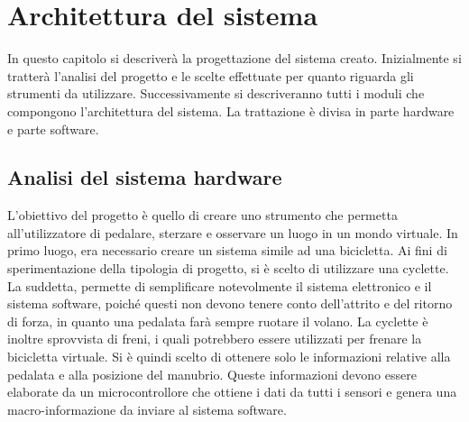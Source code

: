\chapter{Architettura del sistema}
\label{capitolo3}
\thispagestyle{empty}

\noindent In questo capitolo si descriverà la progettazione del sistema creato. Inizialmente si tratterà l'analisi del progetto e le scelte effettuate per quanto riguarda gli strumenti da utilizzare. Successivamente si descriveranno tutti i moduli che compongono l'architettura del sistema. La trattazione è divisa in parte hardware e parte software.
\section{Analisi del sistema hardware}
L'obiettivo del progetto è quello di creare uno strumento che permetta all'utilizzatore di pedalare, sterzare e osservare un luogo in un mondo virtuale. In primo luogo, era necessario creare un sistema simile ad una bicicletta. Ai fini di sperimentazione della tipologia di progetto, si è scelto di utilizzare una cyclette. La suddetta, permette di semplificare notevolmente il sistema elettronico e il sistema software, poiché questi non devono tenere conto dell'attrito e del ritorno di forza, in quanto una pedalata farà sempre ruotare il volano. La cyclette è inoltre sprovvista di freni, i quali potrebbero essere utilizzati per frenare la bicicletta virtuale. Si è quindi scelto di ottenere solo le informazioni relative alla pedalata e alla posizione del manubrio. Queste informazioni devono essere elaborate da un microcontrollore che ottiene i dati da tutti i sensori e genera una macro-informazione da inviare al sistema software.

